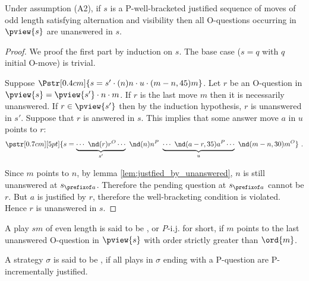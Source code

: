 \begin{lemma}
\label{lem:oq_in_pview_unanswered}
Under assumption (A2), if $s$ is a P-well-bracketed justified sequence of moves of odd length satisfying alternation and visibility then  all O-questions occurring in $\pview{s}$ are unanswered in $s$.
\end{lemma}
\begin{proof}
We proof the first part by induction on $s$.
The base case ($s = q$ with $q$ initial O-move) is trivial.

Suppose $\Pstr[0.4cm]{ s = s' \cdot (n)n \cdot u \cdot (m-n,45){m} }$.
Let $r$ be an O-question in $\pview{s} = \pview{s'} \cdot n \cdot m$.
If $r$ is the last move $m$ then it is necessarily unanswered.
If $r \in \pview{s'}$ then by the induction hypothesis, $r$ is unanswered in $s'$.
Suppose that $r$ is answered in $s$. This implies that some answer move $a$ in $u$ points to $r$:
$$\pstr[0.7cm][5pt]{ s = \underbrace{\cdots\ \nd(r){r}^O \cdots }_{s'} \
\nd(n){n}^P \ \underbrace{\cdots\ \nd(a-r,35){a}^P \cdots }_{u} \
\nd(m-n,30){m}^O } \ .$$

Since $m$ points to $n$, by lemma \ref{lem:justfied_by_unanswered}, $n$ is still unanswered at $s_{\prefixof a}$. Therefore the pending
question at $s_{\prefixof a}$ cannot be $r$. But $a$ is justified by $r$, therefore the well-bracketing condition is violated. Hence $r$ is
unanswered in $s$.
\end{proof}





\begin{definition}\rm
A play $s m$ of even length is said to be , or {\emph P-i.j.} for short, if $m$ points to the last unanswered O-question in $\pview{s}$ with order strictly greater than $\ord{m}$.

 A strategy $\sigma$ is said to be \defname{P-incrementally justified}, if all plays in $\sigma$ ending with a P-question are
P-incrementally justified.
\end{definition}

